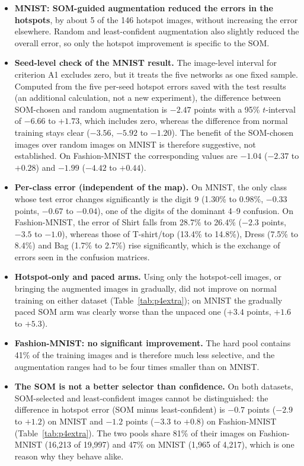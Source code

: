 \documentclass{scrartcl}
\begin{document}
\begin{itemize}
  \item \textbf{MNIST: SOM-guided augmentation reduced the errors in the hotspots}, by about 5 of the 146 hotspot images, without increasing the error elsewhere. Random and least-confident augmentation also slightly reduced the overall error, so only the hotspot improvement is specific to the SOM.
  \item \textbf{Seed-level check of the MNIST result.} The image-level interval for criterion A1 excludes zero, but it treats the five networks as one fixed sample. Computed from the five per-seed hotspot errors saved with the test results (an additional calculation, not a new experiment), the difference between SOM-chosen and random augmentation is $-2.47$ points with a 95\% $t$-interval of $-6.66$ to $+1.73$, which includes zero, whereas the difference from normal training stays clear ($-3.56$, $-5.92$ to $-1.20$). The benefit of the SOM-chosen images over random images on MNIST is therefore suggestive, not established. On Fashion-MNIST the corresponding values are $-1.04$ ($-2.37$ to $+0.28$) and $-1.99$ ($-4.42$ to $+0.44$).
  \item \textbf{Per-class error (independent of the map).} On MNIST, the only class whose test error changes significantly is the digit 9 (1.30\% to 0.98\%, $-0.33$ points, $-0.67$ to $-0.04$), one of the digits of the dominant 4--9 confusion. On Fashion-MNIST, the error of Shirt falls from 28.7\% to 26.4\% ($-2.3$ points, $-3.5$ to $-1.0$), whereas those of T-shirt/top (13.4\% to 14.8\%), Dress (7.5\% to 8.4\%) and Bag (1.7\% to 2.7\%) rise significantly, which is the exchange of errors seen in the confusion matrices.
  \item \textbf{Hotspot-only and paced arms.} Using only the hotspot-cell images, or bringing the augmented images in gradually, did not improve on normal training on either dataset (Table~\ref{tab:p4extra}); on MNIST the gradually paced SOM arm was clearly worse than the unpaced one ($+3.4$ points, $+1.6$ to $+5.3$).
  \item \textbf{Fashion-MNIST: no significant improvement.} The hard pool contains 41\% of the training images and is therefore much less selective, and the augmentation ranges had to be four times smaller than on MNIST.
  \item \textbf{The SOM is not a better selector than confidence.} On both datasets, SOM-selected and least-confident images cannot be distinguished: the difference in hotspot error (SOM minus least-confident) is $-0.7$ points ($-2.9$ to $+1.2$) on MNIST and $-1.2$ points ($-3.3$ to $+0.8$) on Fashion-MNIST (Table~\ref{tab:p4extra}). The two pools share 81\% of their images on Fashion-MNIST (16,213 of 19,997) and 47\% on MNIST (1,965 of 4,217), which is one reason why they behave alike.

\end{itemize}
\end{document}

